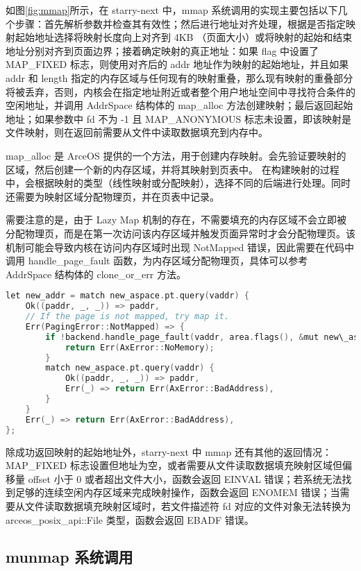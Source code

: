 如图\ref{fig:mmap}所示，在 starry-next 中，mmap 系统调用的实现主要包括以下几个步骤：首先解析参数并检查其有效性；然后进行地址对齐处理，根据是否指定映射起始地址选择将映射长度向上对齐到 4KB （页面大小）或将映射的起始和结束地址分别对齐到页面边界；接着确定映射的真正地址：如果 flag 中设置了 MAP\_FIXED 标志，则使用对齐后的 addr 地址作为映射的起始地址，并且如果 addr 和 length 指定的内存区域与任何现有的映射重叠，那么现有映射的重叠部分将被丢弃，否则，内核会在指定地址附近或者整个用户地址空间中寻找符合条件的空闲地址，并调用 AddrSpace 结构体的 map\_alloc 方法创建映射；最后返回起始地址；如果参数中 fd 不为 -1 且 MAP\_ANONYMOUS 标志未设置，即该映射是文件映射，则在返回前需要从文件中读取数据填充到内存中。

map\_alloc 是 ArceOS 提供的一个方法，用于创建内存映射。会先验证要映射的区域，然后创建一个新的内存区域，并将其映射到页表中。
在构建映射的过程中，会根据映射的类型（线性映射或分配映射），选择不同的后端进行处理。同时还需要为映射区域分配物理页，并在页表中记录。

需要注意的是，由于 Lazy Map 机制的存在，不需要填充的内存区域不会立即被分配物理页，而是在第一次访问该内存区域并触发页面异常时才会分配物理页。该机制可能会导致内核在访问内存区域时出现 NotMapped 错误，因此需要在代码中调用 handle\_page\_fault 函数，为内存区域分配物理页，具体可以参考 AddrSpace 结构体的 clone\_or\_err 方法。

\begin{lstlisting}[language=c, caption=deal with NotMapped]
let new_addr = match new_aspace.pt.query(vaddr) {
    Ok((paddr, _, _)) => paddr,
    // If the page is not mapped, try map it.
    Err(PagingError::NotMapped) => {
        if !backend.handle_page_fault(vaddr, area.flags(), &mut new\_aspace.pt) {
            return Err(AxError::NoMemory);
        }
        match new_aspace.pt.query(vaddr) {
            Ok((paddr, _, _)) => paddr,
            Err(_) => return Err(AxError::BadAddress),
        }
    }
    Err(_) => return Err(AxError::BadAddress),
};
\end{lstlisting}


除成功返回映射的起始地址外，starry-next 中 mmap 还有其他的返回情况：MAP\_FIXED 标志设置但地址为空，或者需要从文件读取数据填充映射区域但偏移量 offset 小于 0 或者超出文件大小，函数会返回 EINVAL 错误；若系统无法找到足够的连续空闲内存区域来完成映射操作，函数会返回 ENOMEM 错误；当需要从文件读取数据填充映射区域时，若文件描述符 fd 对应的文件对象无法转换为 arceos\_posix\_api::File 类型，函数会返回 EBADF 错误。

\subsection{munmap 系统调用}

